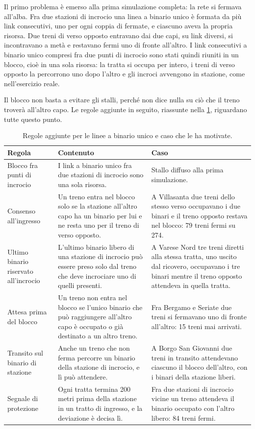Il primo problema è emerso alla prima simulazione completa: la rete si fermava all'alba. Fra due stazioni di incrocio una linea a binario unico è formata da più link consecutivi, uno per ogni coppia di fermate, e ciascuno aveva la propria risorsa. Due treni di verso opposto entravano dai due capi, su link diversi, si incontravano a metà e restavano fermi uno di fronte all'altro. I link consecutivi a binario unico compresi fra due punti di incrocio sono stati quindi riuniti in un blocco, cioè in una sola risorsa: la tratta si occupa per intero, i treni di verso opposto la percorrono uno dopo l'altro e gli incroci avvengono in stazione, come nell'esercizio reale.

Il blocco non basta a evitare gli stalli, perché non dice nulla su ciò che il treno troverà all'altro capo. Le regole aggiunte in seguito, riassunte nella \cref{tab:regole-binario-unico}, riguardano tutte questo punto.

\begin{table}[H]
	\centering
	\caption{Regole aggiunte per le linee a binario unico e caso che le ha motivate.}
	\label{tab:regole-binario-unico}
	\begin{tabularx}{\textwidth}{>{\raggedright\arraybackslash}p{}XX}
		\toprule
		Regola & Contenuto & Caso \\
		\midrule
		Blocco fra punti di incrocio & I link a binario unico fra due stazioni di incrocio sono una sola risorsa. & Stallo diffuso alla prima simulazione. \\
		Consenso all'ingresso & Un treno entra nel blocco solo se la stazione all'altro capo ha un binario per lui e ne resta uno per il treno di verso opposto. & A Villasanta due treni dello stesso verso occupavano i due binari e il treno opposto restava nel blocco: 79 treni fermi su 274. \\
		Ultimo binario riservato all'incrocio & L'ultimo binario libero di una stazione di incrocio può essere preso solo dal treno che deve incrociare uno di quelli presenti. & A Varese Nord tre treni diretti alla stessa tratta, uno uscito dal ricovero, occupavano i tre binari mentre il treno opposto attendeva in quella tratta. \\
		Attesa prima del blocco & Un treno non entra nel blocco se l'unico binario che può raggiungere all'altro capo è occupato o già destinato a un altro treno. & Fra Bergamo e Seriate due treni si fermavano uno di fronte all'altro: 15 treni mai arrivati. \\
		Transito sul binario di stazione & Anche un treno che non ferma percorre un binario della stazione di incrocio, e lì può attendere. & A Borgo San Giovanni due treni in transito attendevano ciascuno il blocco dell'altro, con i binari della stazione liberi. \\
		Segnale di protezione & Ogni tratta termina 200 metri prima della stazione in un tratto di ingresso, e la deviazione è decisa lì. & Fra due stazioni di incrocio vicine un treno attendeva il binario occupato con l'altro libero: 84 treni fermi. \\
		\bottomrule
	\end{tabularx}
\end{table}

